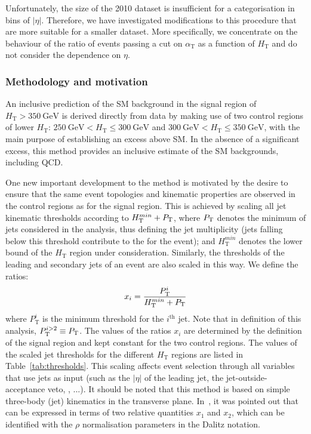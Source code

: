 Unfortunately, the size of the 2010 dataset is insufficient for a
categorisation in bins of $|\eta|$. Therefore, we have investigated
modifications to this procedure that are more suitable for a smaller
dataset. More specifically, we concentrate on the behaviour of the
ratio of events passing a cut on $\alpha_{\mathrm{T}}$ as a function
of $H_{\mathrm{T}}$ and do not consider the dependence on $\eta$.

\subsubsection{Methodology and motivation\label{sec:ht_scaling_method}}

An inclusive prediction of the SM background in the signal region of
$H_{\mathrm{T}} > 350~\mathrm{GeV}$ is derived directly from data by
making use of two control regions of lower $H_{\mathrm{T}}$:
$250~\mathrm{GeV} < H_{\mathrm{T}} \leq 300~\mathrm{GeV}$ and
$300~\mathrm{GeV} < H_{\mathrm{T}} \leq 350~\mathrm{GeV}$, with the
main purpose of establishing an excess above SM. In the absence of a
significant excess, this method provides an inclusive estimate of the
SM backgrounds, including QCD.

One new important development to the method is motivated by the desire
to ensure that the same event topologies and kinematic properties are
observed in the control regions as for the signal region. This is
achieved by scaling all jet kinematic thresholds according to
$H_{\mathrm{T}}^{min} + P_{\mathrm{T}}$, where $P_{\mathrm{T}}$ denotes the minimum
\pt of jets considered in the analysis, thus defining the jet
multiplicity (jets falling below this threshold contribute to the \MHT
for the event); and $H_{\mathrm{T}}^{min}$ denotes the lower bound of
the $H_{\mathrm{T}}$ region under consideration. Similarly, the \pt
thresholds of the leading and secondary jets of an event are also
scaled in this way. We define the ratios:
\begin{equation}
x_i = \frac{P^{i}_{\mathrm{T}}}{H_{\mathrm{T}}^{min} + P_{\mathrm{T}}} 
\end{equation}
where $P^{i}_{\mathrm{T}}$ is the minimum \pt threshold for the
$i^{\mathrm{th}}$ jet. Note that in definition of this analysis,
$P^{i>2}_{\mathrm{T}} \equiv P_{\mathrm{T}}$. The values of the ratios $x_i$
are determined by the definition of the signal region and kept
constant for the two control regions. The values of the scaled \pt jet
thresholds for the different $H_{\mathrm{T}}$ regions are listed in
Table~\ref{tab:thresholds}. This scaling affects event selection
through all variables that use jets as input (such as the $|\eta|$ of
the leading jet, the jet-outside-acceptance veto, \aT, ...). It should
be noted that this method is based on simple three-body (jet)
kinematics in the transverse plane. In~\cite{cousins}, it was pointed
out that \aT can be expressed in terms of two relative quantities
$x_1$ and $x_2$, which can be identified with the $\rho$ normalisation
parameters in the Dalitz notation.

